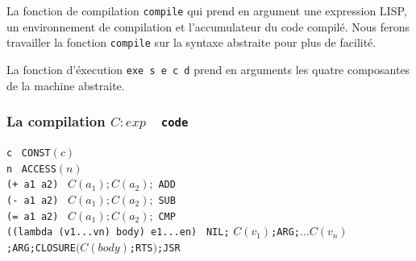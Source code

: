 La fonction de compilation \verb+compile+ qui prend en argument une expression LISP, 
un environnement de compilation et l'accumulateur du code compilé.
Nous ferons travailler la fonction \verb+compile+ sur la syntaxe abstraite pour plus de facilité.


La fonction d'éxecution  \verb+exe s e c d+  prend en arguments les 
quatre composantes de la machine abstraite.

\subsubsection{La compilation $C: exp$\ \imp\ \texttt{code}}
\noindent
  \texttt{c} \imp\ \texttt{CONST}$(c)$ \\
  \texttt{n} \imp\ \texttt{ACCESS}$(n)$ \\
  \texttt{(+ a1 a2)} \imp\ $C(a_1); C(a_2);$ \texttt{ADD} \\
  \texttt{(- a1 a2)} \imp\ $C(a_1); C(a_2);$ \texttt{SUB} \\
  \texttt{(= a1 a2)} \imp\ $C(a_1); C(a_2);$ \texttt{CMP} \\
  \texttt{((lambda (v1...vn) body) e1...en)} 
    \imp\ \texttt{NIL;} $C(v_1)$\texttt{;ARG;}$\dots C(v_n)$\texttt{;ARG;CLOSURE}$(C(body)$\texttt{;RTS}$)$\texttt{;JSR} \\
  


